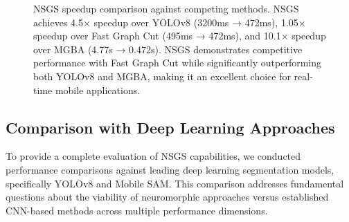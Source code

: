 \documentclass[conference]{IEEEtran}
\begin{document}
\begin{figure}[!htb]
    \centering
    \caption{NSGS speedup comparison against competing methods. NSGS achieves 4.5× speedup over YOLOv8 (3200ms → 472ms), 1.05× speedup over Fast Graph Cut \cite{Garcia2015} (495ms → 472ms), and 10.1× speedup over MGBA \cite{Santos2014} (4.77s → 0.472s). NSGS demonstrates competitive performance with Fast Graph Cut while significantly outperforming both YOLOv8 and MGBA, making it an excellent choice for real-time mobile applications.}
    \label{fig:speedup-comparison}
    \vspace{-0.5cm}
\end{figure}

\subsection{Comparison with Deep Learning Approaches}
To provide a complete evaluation of NSGS capabilities, we conducted performance comparisons against leading deep learning segmentation models, specifically YOLOv8 and Mobile SAM. This comparison addresses fundamental questions about the viability of neuromorphic approaches versus established CNN-based methods across multiple performance dimensions.
\end{document}
